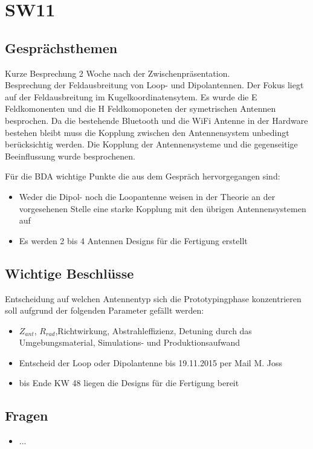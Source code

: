 \documentclass[10pt,a4paper]{article}
\begin{document}
\section*{SW11}

\subsection*{Gesprächsthemen}

Kurze Besprechung 2 Woche nach der Zwischenpräsentation.\\


Besprechung der Feldausbreitung von Loop- und Dipolantennen. Der Fokus liegt auf der Feldausbreitung im Kugelkoordinatensytem. Es wurde die E Feldkomonenten und die H Feldkomoponeten der symetrischen Antennen besprochen. Da die bestehende Bluetooth und die WiFi Antenne in der Hardware bestehen bleibt muss die Kopplung zwischen den Antennensystem unbedingt berücksichtig werden. Die Kopplung der Antennensysteme und die gegenseitige Beeinflussung wurde besprochenen. 

\vspace{10 mm}
Für die BDA wichtige Punkte die aus dem Gespräch hervorgegangen sind:
\begin{itemize}
	\item Weder die Dipol- noch die Loopantenne weisen in der Theorie an der vorgesehenen Stelle eine starke Kopplung mit den übrigen Antennensystemen auf
	\item Es werden 2 bis 4 Antennen Designs für die Fertigung erstellt
	
\end{itemize}

\subsection*{Wichtige Beschlüsse}
Entscheidung auf welchen Antennentyp sich die Prototypingphase konzentrieren soll aufgrund der folgenden Parameter gefällt werden:
\begin{itemize}
	\item $Z_{ant}$, $R_{rad}$,Richtwirkung, Abstrahleffizienz, Detuning durch das Umgebungsmaterial, Simulations- und Produktionsaufwand
	\item Entscheid der Loop oder Dipolantenne bis 19.11.2015 per Mail M. Joss
	\item bis Ende KW 48 liegen die Designs für die Fertigung bereit
\end{itemize}
\subsection*{Fragen}
\begin{itemize}
	\item ...
\end{itemize}
\end{document}
